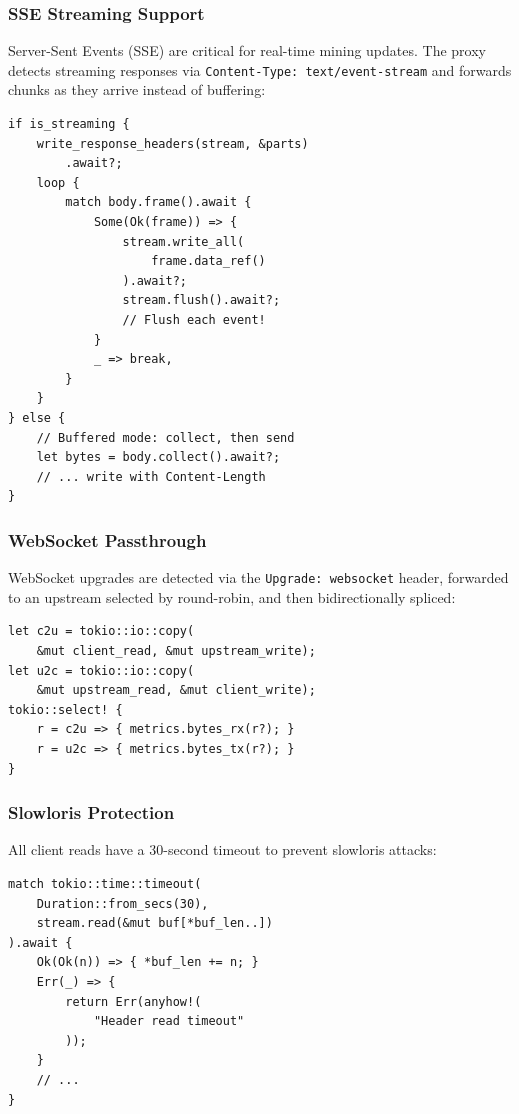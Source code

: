 \documentclass[11pt,a4paper,twocolumn]{article}
\begin{document}
\subsubsection{SSE Streaming Support}

Server-Sent Events (SSE) are critical for real-time mining updates. The proxy detects streaming responses via \texttt{Content-Type: text/event-stream} and forwards chunks as they arrive instead of buffering:

\begin{lstlisting}
if is_streaming {
    write_response_headers(stream, &parts)
        .await?;
    loop {
        match body.frame().await {
            Some(Ok(frame)) => {
                stream.write_all(
                    frame.data_ref()
                ).await?;
                stream.flush().await?;
                // Flush each event!
            }
            _ => break,
        }
    }
} else {
    // Buffered mode: collect, then send
    let bytes = body.collect().await?;
    // ... write with Content-Length
}
\end{lstlisting}

\subsubsection{WebSocket Passthrough}

WebSocket upgrades are detected via the \texttt{Upgrade: websocket} header, forwarded to an upstream selected by round-robin, and then bidirectionally spliced:

\begin{lstlisting}
let c2u = tokio::io::copy(
    &mut client_read, &mut upstream_write);
let u2c = tokio::io::copy(
    &mut upstream_read, &mut client_write);
tokio::select! {
    r = c2u => { metrics.bytes_rx(r?); }
    r = u2c => { metrics.bytes_tx(r?); }
}
\end{lstlisting}

\subsubsection{Slowloris Protection}

All client reads have a 30-second timeout to prevent slowloris attacks:

\begin{lstlisting}
match tokio::time::timeout(
    Duration::from_secs(30),
    stream.read(&mut buf[*buf_len..])
).await {
    Ok(Ok(n)) => { *buf_len += n; }
    Err(_) => {
        return Err(anyhow!(
            "Header read timeout"
        ));
    }
    // ...
}
\end{lstlisting}
\end{document}
